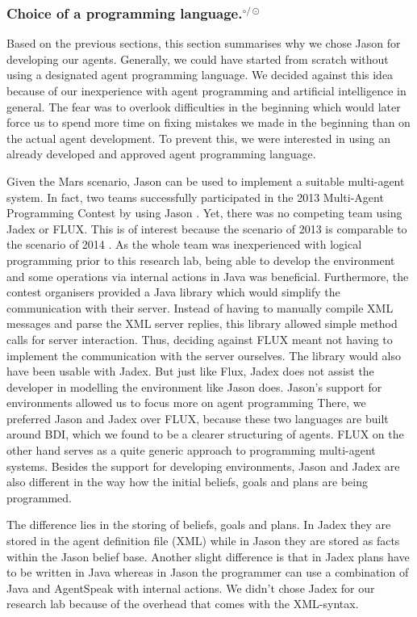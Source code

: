 \subsubsection[Choice of a programming language.]{Choice of a programming language.$^{\circ/\odot}$}\label{fun:apl_choice}
Based on the previous sections, this section summarises why we chose Jason for developing our agents.
Generally, we could have started from scratch without using a designated agent programming language.
We decided against this idea because of our inexperience with agent programming and artificial intelligence in general.
The fear was to overlook difficulties in the beginning which would later force us to spend more time on fixing mistakes we made in the beginning than on the actual agent development.
To prevent this, we were interested in using an already developed and approved agent programming language.

Given the Mars scenario, Jason can be used to implement a suitable multi-agent system.
In fact, two teams successfully participated in the 2013 Multi-Agent Programming Contest by using Jason \cite{ahlbrecht_multi_2013}. %
Yet, there was no competing team using Jadex or FLUX.
This is of interest because the scenario of 2013 is comparable to the scenario of 2014 \cite{ahlbrecht_mapc_2014}. %
As the whole team was inexperienced with logical programming prior to this research lab, being able to develop the environment and some operations via internal actions in Java was beneficial.
Furthermore, the contest organisers provided a Java library which would simplify the communication with their server.
Instead of having to manually compile XML messages and parse the XML server replies, this library allowed simple method calls for server interaction.
Thus, deciding against FLUX meant not having to implement the communication with the server ourselves.
The library would also have been usable with Jadex.
But just like Flux, Jadex does not assist the developer in modelling the environment like Jason does.
Jason's support for environments allowed us to focus more on agent programming
There, we preferred Jason and Jadex over FLUX, because these two languages are built around BDI, which we found to be a clearer structuring of agents.
FLUX on the other hand serves as a quite generic approach to programming multi-agent systems.
Besides the support for developing environments, Jason and Jadex are also different in the way how the initial beliefs, goals and plans are being programmed.

The difference lies in the storing of beliefs, goals and plans.
In Jadex they are stored in the agent definition file (XML) while in Jason they are stored as facts within the Jason belief base. %
Another slight difference is that in Jadex plans have to be written in Java whereas in Jason the programmer can use a combination of Java and AgentSpeak with internal actions.
We didn't chose Jadex for our research lab because of the overhead that comes with the XML-syntax.
